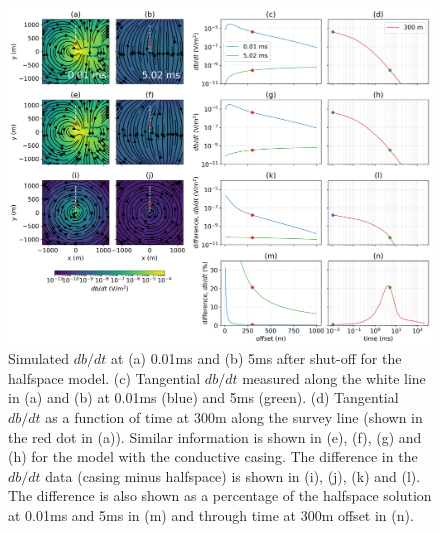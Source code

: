 \begin{figure}
    \begin{center}
    \includegraphics[width=\textwidth]{figures/em_casing/surface_dbdt_overview.png}
    \end{center}
\caption{
    Simulated $db/dt$ at (a) 0.01ms and (b) 5ms after shut-off for the halfspace model.
    (c) Tangential $db/dt$ measured along the white line in (a) and (b) at 0.01ms (blue) and 5ms (green).
    (d) Tangential $db/dt$ as a function of time at 300m along the survey line (shown in the red dot in (a)).
    Similar information is shown in (e), (f), (g) and (h) for the model with the conductive casing.
    The difference in the $db/dt$ data (casing minus halfspace) is shown in (i), (j), (k) and (l).
    The difference is also shown as a percentage of the halfspace solution at 0.01ms and 5ms in (m)
    and through time at 300m offset in (n).
}
\label{fig:surface_dbdt_overview}
\end{figure}



